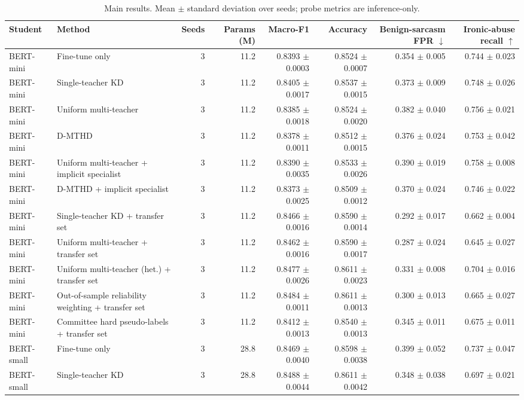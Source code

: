 \begin{table}[t]
\centering
\caption{Main results. Mean $\pm$ standard deviation over seeds; probe metrics are inference-only.}
\label{tab:main}
\begin{tabular}{llrrrrrr}
\toprule
Student & Method & Seeds & Params (M) & Macro-F1 & Accuracy & Benign-sarcasm FPR $\downarrow$ & Ironic-abuse recall $\uparrow$ \\
\midrule
BERT-mini & Fine-tune only & 3 & 11.2 & 0.8393 $\pm$ 0.0003 & 0.8524 $\pm$ 0.0007 & 0.354 $\pm$ 0.005 & 0.744 $\pm$ 0.023 \\
BERT-mini & Single-teacher KD & 3 & 11.2 & 0.8405 $\pm$ 0.0017 & 0.8537 $\pm$ 0.0015 & 0.373 $\pm$ 0.009 & 0.748 $\pm$ 0.026 \\
BERT-mini & Uniform multi-teacher & 3 & 11.2 & 0.8385 $\pm$ 0.0018 & 0.8524 $\pm$ 0.0020 & 0.382 $\pm$ 0.040 & 0.756 $\pm$ 0.021 \\
BERT-mini & D-MTHD & 3 & 11.2 & 0.8378 $\pm$ 0.0011 & 0.8512 $\pm$ 0.0015 & 0.376 $\pm$ 0.024 & 0.753 $\pm$ 0.042 \\
BERT-mini & Uniform multi-teacher + implicit specialist & 3 & 11.2 & 0.8390 $\pm$ 0.0035 & 0.8533 $\pm$ 0.0026 & 0.390 $\pm$ 0.019 & 0.758 $\pm$ 0.008 \\
BERT-mini & D-MTHD + implicit specialist & 3 & 11.2 & 0.8373 $\pm$ 0.0025 & 0.8509 $\pm$ 0.0012 & 0.370 $\pm$ 0.024 & 0.746 $\pm$ 0.022 \\
BERT-mini & Single-teacher KD + transfer set & 3 & 11.2 & 0.8466 $\pm$ 0.0016 & 0.8590 $\pm$ 0.0014 & 0.292 $\pm$ 0.017 & 0.662 $\pm$ 0.004 \\
BERT-mini & Uniform multi-teacher + transfer set & 3 & 11.2 & 0.8462 $\pm$ 0.0016 & 0.8590 $\pm$ 0.0017 & 0.287 $\pm$ 0.024 & 0.645 $\pm$ 0.027 \\
BERT-mini & Uniform multi-teacher (het.) + transfer set & 3 & 11.2 & 0.8477 $\pm$ 0.0026 & 0.8611 $\pm$ 0.0023 & 0.331 $\pm$ 0.008 & 0.704 $\pm$ 0.016 \\
BERT-mini & Out-of-sample reliability weighting + transfer set & 3 & 11.2 & 0.8484 $\pm$ 0.0011 & 0.8611 $\pm$ 0.0013 & 0.300 $\pm$ 0.013 & 0.665 $\pm$ 0.027 \\
BERT-mini & Committee hard pseudo-labels + transfer set & 3 & 11.2 & 0.8412 $\pm$ 0.0013 & 0.8540 $\pm$ 0.0013 & 0.345 $\pm$ 0.011 & 0.675 $\pm$ 0.011 \\
BERT-small & Fine-tune only & 3 & 28.8 & 0.8469 $\pm$ 0.0040 & 0.8598 $\pm$ 0.0038 & 0.399 $\pm$ 0.052 & 0.737 $\pm$ 0.047 \\
BERT-small & Single-teacher KD & 3 & 28.8 & 0.8488 $\pm$ 0.0044 & 0.8611 $\pm$ 0.0042 & 0.348 $\pm$ 0.038 & 0.697 $\pm$ 0.021 \\

\end{tabular}
\end{table}
